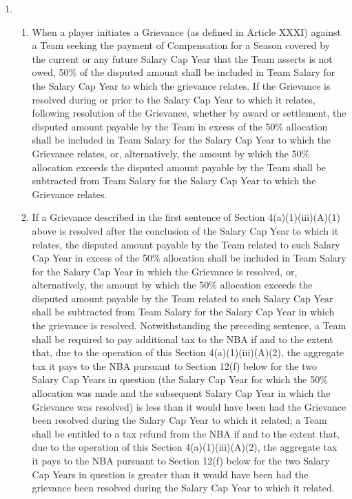 \documentclass[
]{book}
\providecommand{\tightlist}{%
  \setlength{\itemsep}{0pt}\setlength{\parskip}{0pt}}
\begin{document}
\begin{enumerate}
\begin{enumerate}
\begin{enumerate}
      \begin{enumerate}
      \def\labelenumiv{(\Alph{enumiv})}
      \item
        \begin{enumerate}
        \def\labelenumv{(\arabic{enumv})}
        \tightlist
        \item
          When a player initiates a Grievance (as defined in Article XXXI) against a Team seeking the payment of Compensation for a Season covered by the current or any future Salary Cap Year that the Team asserts is not owed, 50\% of the disputed amount shall be included in Team Salary for the Salary Cap Year to which the grievance relates. If the Grievance is resolved during or prior to the Salary Cap Year to which it relates, following resolution of the Grievance, whether by award or settlement, the disputed amount payable by the Team in excess of the 50\% allocation shall be included in Team Salary for the Salary Cap Year to which the Grievance relates, or, alternatively, the amount by which the 50\% allocation exceeds the disputed amount payable by the Team shall be subtracted from Team Salary for the Salary Cap Year to which the Grievance relates.
        \item
          If a Grievance described in the first sentence of Section 4(a)(1)(iii)(A)(1) above is resolved after the conclusion of the Salary Cap Year to which it relates, the disputed amount payable by the Team related to such Salary Cap Year in excess of the 50\% allocation shall be included in Team Salary for the Salary Cap Year in which the Grievance is resolved, or, alternatively, the amount by which the 50\% allocation exceeds the disputed amount payable by the Team related to such Salary Cap Year shall be subtracted from Team Salary for the Salary Cap Year in which the grievance is resolved. Notwithstanding the preceding sentence, a Team shall be required to pay additional tax to the NBA if and to the extent that, due to the operation of this Section 4(a)(1)(iii)(A)(2), the aggregate tax it pays to the NBA pursuant to Section 12(f) below for the two Salary Cap Years in question (the Salary Cap Year for which the 50\% allocation was made and the subsequent Salary Cap Year in which the Grievance was resolved) is less than it would have been had the Grievance been resolved during the Salary Cap Year to which it related; a Team shall be entitled to a tax refund from the NBA if and to the extent that, due to the operation of this Section 4(a)(1)(iii)(A)(2), the aggregate tax it pays to the NBA pursuant to Section 12(f) below for the two Salary Cap Years in question is greater than it would have been had the grievance been resolved during the Salary Cap Year to which it related.

\end{enumerate}
\end{enumerate}
\end{enumerate}
\end{enumerate}
\end{enumerate}
\end{document}
